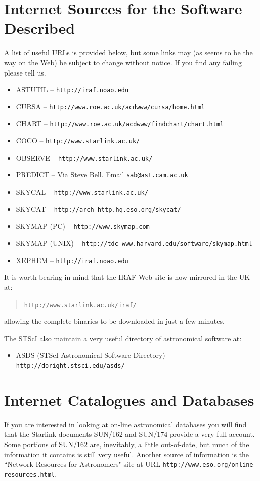 \documentclass[twoside,11pt]{article}
\newcommand{\htmladdnormallink}[2]{#1}
\newcommand{\xref}[3]{#1}
\newcommand{\xlabel}[1]{}
\newcommand{\IRAFref}{\htmladdnormallink{IRAF}{http://www.starlink.ac.uk/iraf/}}
\newcommand{\SUNCATref}{\xref{SUN/162}{sun162}{}}
\newcommand{\SUNCATBref}{\xref{SUN/174}{sun174}{}}
\newcommand{\HTTPAref}{\htmladdnormallink{\tt http://www.starlink.ac.uk/}{http://www.starlink.ac.uk/}}
\newcommand{\HTTPBref}{\htmladdnormallink{\tt http://iraf.noao.edu}{http://iraf.noao.edu}}
\newcommand{\HTTPCref}{\htmladdnormallink{\tt http://www.skymap.com}{http://www.skymap.com}}
\newcommand{\HTTPMref}{\htmladdnormallink{\tt http://arch-http.hq.eso.org/skycat/}{http://arch-http.hq.eso.org/skycat/}}
\newcommand{\HTTPNref}{\htmladdnormallink{\tt http://tdc-www.harvard.edu/software/skymap.html}{http://tdc-www.harvard.edu/software/skymap.html}}
\newcommand{\HTTPOref}{\htmladdnormallink{\tt http://doright.stsci.edu/asds/}{http://doright.stsci.edu/asds/}}
\newcommand{\HTTPBDref}{\htmladdnormallink{\tt http://www.roe.ac.uk/acdwww/cursa/home.html}{http://www.roe.ac.uk/acdwww/cursa/home.html}}
\newcommand{\HTTPBEref}{\htmladdnormallink{\tt http://www.roe.ac.uk/acdwww/findchart/chart.html}{http://www.roe.ac.uk/acdwww/findchart/chart.html}}
\newcommand{\HTTPBFref}{\htmladdnormallink{\tt http://www.eso.org/online-resources.html}{http://www.eso.org/online-resources.html}}
\begin{document}
\section{Internet Sources for the Software Described} \xlabel{SOURCESSOFT}
\label{sec:sourcessoft}

A list of useful URLs is provided below, but some links may (as seems to be
the way on the Web) be subject to change without notice. If you find any
failing please tell us.

\begin{itemize}
\item ASTUTIL -- {\HTTPBref}
\item CURSA --  {\HTTPBDref}
\item CHART -- {\HTTPBEref}
\item COCO -- {\HTTPAref}
\item OBSERVE -- {\HTTPAref}
\item PREDICT -- Via Steve Bell. Email {\tt sab@ast.cam.ac.uk}
\item SKYCAL -- {\HTTPAref}
\item SKYCAT -- {\HTTPMref}
\item SKYMAP (PC) -- {\HTTPCref}
\item SKYMAP (UNIX) -- {\HTTPNref}
\item XEPHEM -- {\HTTPBref}
\end{itemize}

It is worth bearing in mind that the {\IRAFref} Web site is now mirrored
in the UK at:
\begin{quote}
{\tt http://www.starlink.ac.uk/iraf/}
\end{quote}
allowing the complete binaries to be downloaded in just a few minutes.

The STScI also maintain a very useful directory of astronomical software at:

\begin{itemize}
\item ASDS (STScI Astronomical Software Directory) -- {\HTTPOref}
\end{itemize}

\section{Internet Catalogues and Databases} \xlabel{CATALOGUE}
\label{sec:catalogue}

If you are interested in looking at on-line astronomical databases you
will find that the Starlink documents {\SUNCATref} and {\SUNCATBref} provide a very full account.
Some portions of SUN/162 are, inevitably, a little out-of-date, but much of the information
it contains is still very useful. Another source of information is
the ``Network Resources for Astronomers" site at URL
{\HTTPBFref}.
\end{document}
